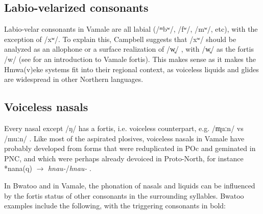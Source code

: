 	
	
	\subsection{Labio-velarized consonants}
	Labio-velar consonants in Vamale are all labial (/ᵐbʷ/, /fʷ/, /mʷ/, etc), with the exception of /xʷ/. To explain this, Campbell suggests that /xʷ/ should be analyzed as an allophone or a surface realization of /w̥/ \parencite[37]{campbell_phenomenon_1987}, with /w̥/ as the fortis %
	/w/ (see  for an introduction to Vamale fortis). This makes sense as it makes the Hmwa(v)eke systems fit into their regional context, as voiceless liquids and glides are widespread in other Northern languages. 
	
	\subsection{Voiceless nasals}
	\label{sec:phonhist_dev}
	Every nasal except /ŋ/ has a fortis, i.e. voiceless counterpart, e.g. /m̥uːn/  vs /muːn/ . Like most of the aspirated plosives, voiceless nasals in Vamale have probably developed from forms that were reduplicated in POc and geminated in PNC, and which were perhaps already devoiced in Proto-North, for instance *nana(q)  $\rightarrow$	\textit{hnau-}\slash\textit{hnau-}  \parencite[27]{ozanne-rivierre_phonologie_1982}.

	In Bwatoo and in Vamale, the phonation of nasals and liquids can be influenced by the fortis status of other consonants in the surrounding syllables. Bwatoo examples include the following, with the triggering consonants in bold:
	
